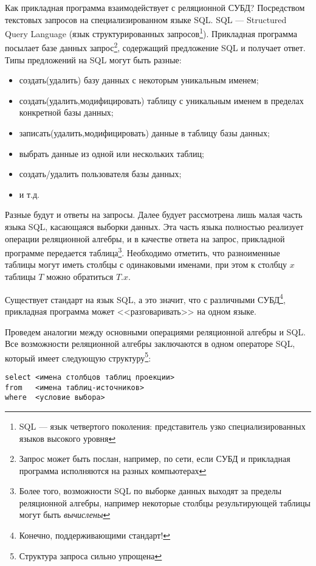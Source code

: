 Как прикладная программа взаимодействует с реляционной СУБД? Посредством текстовых запросов на специализированном языке SQL. SQL --- Structured Query Language (язык структурированных запросов\footnote{SQL --- язык четвертого поколения: представитель узко специализированных языков высокого уровня}). Прикладная программа посылает базе данных запрос\footnote{Запрос может быть послан, например, по сети, если СУБД и прикладная программа исполняются на разных компьютерах}, содержащий предложение SQL и получает ответ. Типы предложений на SQL могут быть разные: 
\begin{itemize}
    \item создать(удалить) базу данных с некоторым уникальным именем;
    \item создать(удалить,модифицировать) таблицу с уникальным именем в пределах конкретной базы данных;
    \item записать(удалить,модифицировать) данные в таблицу базы данных;
    \item выбрать данные из одной или нескольких таблиц;
    \item создать/удалить пользователя базы данных;
    \item и т.д.
\end{itemize}

Разные будут и ответы на запросы. Далее будует рассмотрена лишь малая часть языка SQL, касающаяся выборки данных. Эта часть языка полностью реализует операции реляционной алгебры, и в качестве ответа на запрос, прикладной программе передается таблица\footnote{Более того, возможности SQL по выборке данных выходят за пределы реляционной алгебры, например некоторые столбцы результирующей таблицы могут быть \emph{вычислены}}. Необходимо отметить, что разноименные таблицы могут иметь столбцы с одинаковыми именами, при этом к столбцу $x$ таблицы $T$ можно обратиться $T.x$.

Существует стандарт на язык SQL, а это значит, что с различными СУБД\footnote{Конечно, поддерживающими стандарт!}, прикладная программа может <<разговаривать>> на одном языке.

Проведем аналогии между основными операциями реляционной алгебры и SQL. Все возможности реляционной алгебры заключаются в одном операторе SQL, который имеет следующую структуру\footnote{Структура запроса сильно упрощена}:
\begin{verbatim}
select <имена столбцов таблиц проекции>
from   <имена таблиц-источников>
where  <условие выбора>
\end{verbatim}


